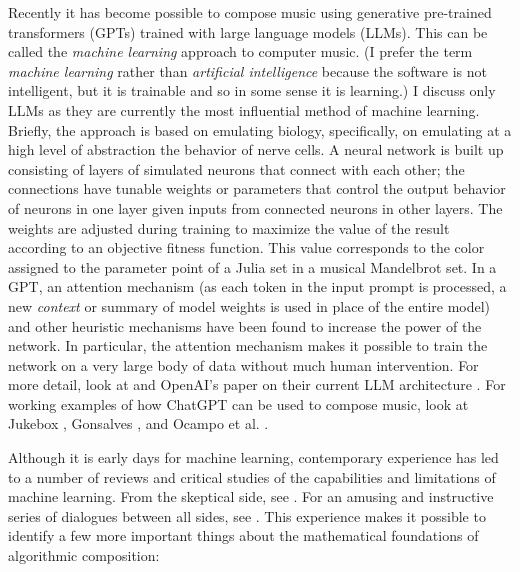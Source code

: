 \documentclass[11pt]{scrartcl}
\begin{document}
Recently it has become possible to compose music using generative pre-trained transformers (GPTs) trained with large language models (LLMs). This can be called the \emph{machine learning} approach to computer music. (I prefer the term \emph{machine learning} rather than \emph{artificial intelligence} because the software is not intelligent, but it is trainable and so in some sense it is learning.) I discuss only LLMs as they are currently the most influential method of machine learning. Briefly, the approach is based on emulating biology, specifically, on emulating at a high level of abstraction the behavior of nerve cells. A neural network is built up consisting of layers of simulated neurons that connect with each other; the connections have tunable weights or parameters that control the output behavior of neurons in one layer given inputs from connected neurons in other layers. The weights are adjusted during training to maximize the value of the result according to an objective fitness function. This value corresponds to the color assigned to the parameter point of a Julia set in a musical Mandelbrot set. In a GPT, an attention mechanism \parencite{vaswani2017attention} (as each token in the input prompt is processed, a new \emph{context} or summary of model weights is used in place of the entire model) and other heuristic mechanisms have been found to increase the power of the network. In particular, the attention mechanism makes it possible to train the network on a very large body of data without much human intervention. For more detail, look at \parencite{zhang2023complete} and OpenAI's paper on their current LLM architecture \parencite{openai2023gpt4}. For working examples of how ChatGPT can be used to compose music, look at Jukebox \parencite{openai2023jukebox}, Gonsalves \parencite{aitunes}, and Ocampo et al. \parencite{ocampo2023using}.

Although it is early days for machine learning, contemporary experience has led to a number of reviews and critical studies of the capabilities and limitations of machine learning. From the skeptical side, see \parencite{dale2021gpt}. For an amusing and instructive series of dialogues between all sides, see \parencite{shtetl}. This experience makes it possible to identify a few more important things about the mathematical foundations of algorithmic composition:
\end{document}
